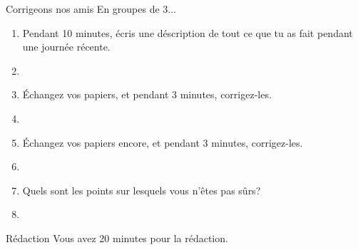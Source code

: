\documentclass{beamer}
\begin{document}
  \begin{frame}{Corrigeons nos amis}
    En groupes de 3...
    \begin{enumerate}
      \item Pendant 10 minutes, écris une déscription de tout ce que tu as fait pendant une journée récente.
      \item[] 
      \item<2-> Échangez vos papiers, et pendant 3 minutes, corrigez-les.
      \item<2->[] 
      \item<3-> Échangez vos papiers encore, et pendant 3 minutes, corrigez-les.
      \item<3->[] 
      \item<4-> Quels sont les points sur lesquels vous n'êtes pas sûrs?
      \item<4->[] 
    \end{enumerate}
  \end{frame}

  \begin{frame}{Rédaction}
    Vous avez 20 minutes pour la rédaction.
  \end{frame}
\end{document}
